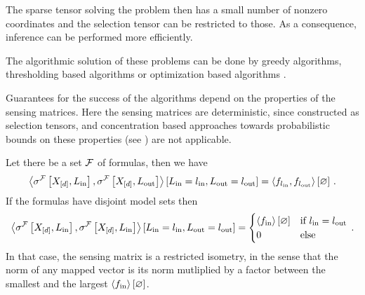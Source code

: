 The sparse tensor solving the problem then has a small number of nonzero coordinates and the selection tensor can be restricted to those.
As a consequence, inference can be performed more efficiently.

The algorithmic solution of these problems can be done by greedy algorithms, thresholding based algorithms or optimization based algorithms \cite{foucart_mathematical_2013}.

Guarantees for the success of the algorithms depend on the properties of the sensing matrices.
Here the sensing matrices are deterministic, since constructed as selection tensors, and concentration based approaches towards probabilistic bounds on these properties (see \cite{goesmann_uniform_2021}) are not applicable.

\begin{example}
	Let there be a set $\mathcal{F}$ of formulas, then we have
	\begin{align*}
		\left\langle \sigma^{\mathcal{F}}\left[X_{[d]},L_{\mathrm{in}}\right],\sigma^{\mathcal{F}}\left[X_{[d]},L_{\mathrm{out}}\right]\right\rangle \left[ L_{\mathrm{in}}=l_{\mathrm{in}},L_{\mathrm{out}}=l_{\mathrm{out}} \right]
		= \left\langle f_{l_{\mathrm{in}}}, f_{l_{\mathrm{out}}}\right\rangle \left[ \varnothing \right] \, .
	\end{align*}
	If the formulas have disjoint model sets then 
	\begin{align*}
		\left\langle \sigma^{\mathcal{F}}\left[X_{[d]},L_{\mathrm{in}}\right],\sigma^{\mathcal{F}}\left[X_{[d]},L_{\mathrm{in}}\right]\right\rangle \left[ L_{\mathrm{in}}=l_{\mathrm{in}},L_{\mathrm{out}}=l_{\mathrm{out}} \right]
		= \begin{cases}
			\left\langle f_{\mathrm{in}}\right\rangle \left[ \varnothing \right] & \text{if } l_{\mathrm{in}}=l_{\mathrm{out}} \\
			0 & \text{else} 
		\end{cases} \, . 
	\end{align*}
	In that case, the sensing matrix is a restricted isometry, in the sense that the norm of any mapped vector is its norm mutliplied by a factor between the smallest and the largest $\left\langle f_{\mathrm{in}}\right\rangle \left[ \varnothing \right]$.
\end{example}


